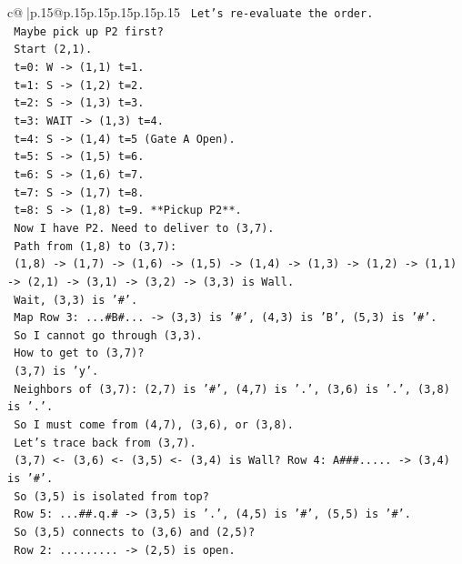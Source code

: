 \documentclass{article}
\begin{document}
{\begin{supertabular}{c@{$\;$}|p{.15\linewidth}@{}p{.15\linewidth}p{.15\linewidth}p{.15\linewidth}p{.15\linewidth}p{.15\linewidth}}
{{{\texttt{    Let's re{-}evaluate the order.} \\
\texttt{    Maybe pick up P2 first?} \\
\texttt{    Start (2,1).} \\
\texttt{    t=0: W {-}> (1,1) t=1.} \\
\texttt{    t=1: S {-}> (1,2) t=2.} \\
\texttt{    t=2: S {-}> (1,3) t=3.} \\
\texttt{    t=3: WAIT {-}> (1,3) t=4.} \\
\texttt{    t=4: S {-}> (1,4) t=5 (Gate A Open).} \\
\texttt{    t=5: S {-}> (1,5) t=6.} \\
\texttt{    t=6: S {-}> (1,6) t=7.} \\
\texttt{    t=7: S {-}> (1,7) t=8.} \\
\texttt{    t=8: S {-}> (1,8) t=9. **Pickup P2**.} \\
\texttt{    Now I have P2. Need to deliver to (3,7).} \\
\texttt{    Path from (1,8) to (3,7):} \\
\texttt{    (1,8) {-}> (1,7) {-}> (1,6) {-}> (1,5) {-}> (1,4) {-}> (1,3) {-}> (1,2) {-}> (1,1) {-}> (2,1) {-}> (3,1) {-}> (3,2) {-}> (3,3) is Wall.} \\
\texttt{    Wait, (3,3) is '\#'.} \\
\texttt{    Map Row 3: ...\#B\#... {-}> (3,3) is '\#', (4,3) is 'B', (5,3) is '\#'.} \\
\texttt{    So I cannot go through (3,3).} \\
\texttt{    How to get to (3,7)?} \\
\texttt{    (3,7) is 'y'.} \\
\texttt{    Neighbors of (3,7): (2,7) is '\#', (4,7) is '.', (3,6) is '.', (3,8) is '.'.} \\
\texttt{    So I must come from (4,7), (3,6), or (3,8).} \\
\texttt{    Let's trace back from (3,7).} \\
\texttt{    (3,7) <{-} (3,6) <{-} (3,5) <{-} (3,4) is Wall? Row 4: A\#\#\#..... {-}> (3,4) is '\#'.} \\
\texttt{    So (3,5) is isolated from top?} \\
\texttt{    Row 5: ...\#\#.q.\# {-}> (3,5) is '.', (4,5) is '\#', (5,5) is '\#'.} \\
\texttt{    So (3,5) connects to (3,6) and (2,5)?} \\
\texttt{    Row 2: ......... {-}> (2,5) is open.} \\
}}}
\end{supertabular}}
\end{document}
